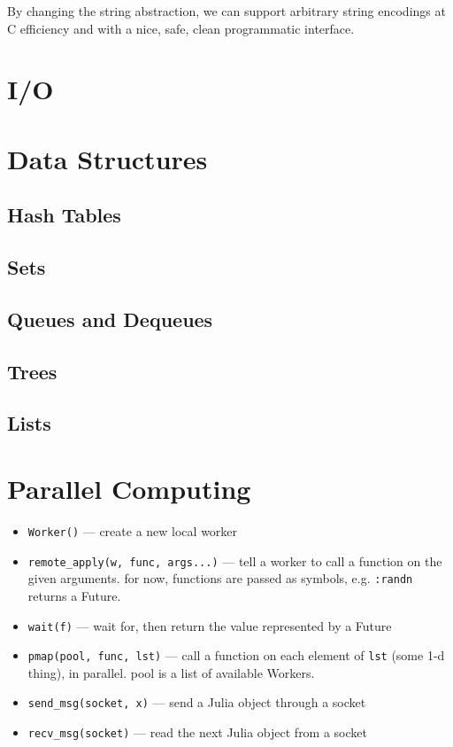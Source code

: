 \documentclass{article}
\begin{document}
By changing the string abstraction, we can support arbitrary string encodings at C efficiency and with a nice, safe, clean programmatic interface.

\section{I/O}
\section{Data Structures}
\subsection{Hash Tables}
\subsection{Sets}
\subsection{Queues and Dequeues}
\subsection{Trees}
\subsection{Lists}

\section{Parallel Computing}
\begin{itemize}
  \item \verb|Worker()| ---
     create a new local worker

  \item \verb|remote_apply(w, func, args...)| ---
     tell a worker to call a function on the given arguments.
     for now, functions are passed as symbols, e.g. \verb|:randn|
     returns a Future.

   \item \verb|wait(f)| ---
     wait for, then return the value represented by a Future

   \item \verb|pmap(pool, func, lst)| ---
     call a function on each element of \verb|lst| (some 1-d thing), in
     parallel. pool is a list of available Workers.

   \item \verb|send_msg(socket, x)| ---
     send a Julia object through a socket

   \item \verb|recv_msg(socket)| ---
     read the next Julia object from a socket
\end{itemize}
\end{document}
